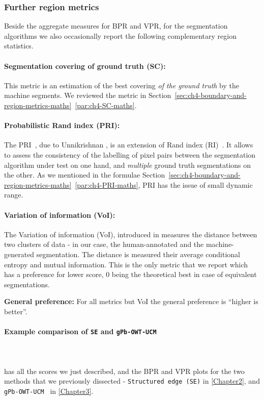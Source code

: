 \subsubsection*{Further region metrics}
Beside the aggregate measures for BPR and VPR, for the segmentation algorithms we also occasionally report the following complementary %
region statistics. %
\paragraph{Segmentation covering of ground truth (SC):} This metric is an estimation of the best covering {\it of the ground truth} by the machine segments. We reviewed the metric in Section~\ref*{sec:ch4-boundary-and-region-metrics-maths}~\ref{par:ch4-SC-maths}.

\paragraph{Probabilistic Rand index (PRI):} The PRI~\cite{UnnikrishnanPH07}, due to Unnikrishnan \etal, is an extension of Rand index (RI)~\cite{rand1971objective}. It allows to assess the consistency of the labelling of pixel pairs between the segmentation algorithm under test on one hand, and {\it multiple} ground truth segmentations on the other. %
As we mentioned in the formulae Section~\ref*{sec:ch4-boundary-and-region-metrics-maths}~\ref{par:ch4-PRI-maths}, PRI has the issue %
of small dynamic range.

\paragraph{Variation of information (VoI):} The Variation of information (VoI), introduced in \cite{Meila05} measures the distance between two clusters of data - in our case, the human-annotated and the machine-generated segmentation. The distance is measured \wrt %
their average conditional entropy and mutual information. This is the only metric that we report which has a preference for lower score, 0 being the theoretical best in case of equivalent segmentations.

\textbf{General preference:} For all metrics but VoI the general preference is ``higher is better''.

\paragraph*{Example comparison of {\tt SE} and {\tt gPb-OWT-UCM}}\mbox{}\\\mbox{}\\
 has all the scores we just described, and  the BPR and VPR plots for the two methods that we previously dissected - {\tt Structured edge (SE)} \cite{DollarICCV13edges} in \cref{Chapter2}, and {\tt gPb-OWT-UCM}~\cite{Arbelaez11} in \cref{Chapter3}. 


